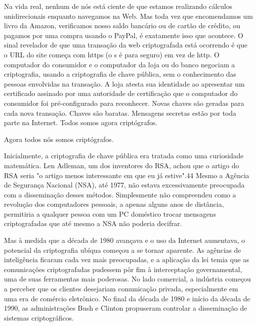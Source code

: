 \documentclass{book}
\begin{document}
Na vida real, nenhum de nós está ciente de que estamos realizando cálculos unidirecionais enquanto navegamos na Web. Mas toda vez que encomendamos um livro da Amazon, verificamos nosso saldo bancário ou de cartão de crédito, ou pagamos por uma compra usando o PayPal, é exatamente isso que acontece. O sinal revelador de que uma transação da web criptografada está ocorrendo é que o URL do site começa com https (o s é para seguro) em vez de http. O computador do consumidor e o computador da loja ou do banco negociam a criptografia, usando a criptografia de chave pública, sem o conhecimento das pessoas envolvidas na transação. A loja atesta sua identidade ao apresentar um certificado assinado por uma autoridade de certificação que o computador do consumidor foi pré-configurado para reconhecer. Novas chaves são geradas para cada nova transação. Chaves são baratas. Mensagens secretas estão por toda parte na Internet. Todos somos agora criptógrafos.

Agora todos nós somos criptógrafos.

Inicialmente, a criptografia de chave pública era tratada como uma curiosidade matemática. Len Adleman, um dos inventores do RSA, achou que o artigo do RSA seria "o artigo menos interessante em que eu já estive".44 Mesmo a Agência de Segurança Nacional (NSA), até 1977, não estava excessivamente preocupada com a disseminação desses métodos. Simplesmente não compreendeu como a revolução dos computadores pessoais, a apenas alguns anos de distância, permitiria a qualquer pessoa com um PC doméstico trocar mensagens criptografadas que até mesmo a NSA não poderia decifrar.

Mas à medida que a década de 1980 avançava e o uso da Internet aumentava, o potencial da criptografia ubíqua começou a se tornar aparente. As agências de inteligência ficaram cada vez mais preocupadas, e a aplicação da lei temia que as comunicações criptografadas pudessem pôr fim à interceptação governamental, uma de suas ferramentas mais poderosas. No lado comercial, a indústria começou a perceber que os clientes desejariam comunicação privada, especialmente em uma era de comércio eletrônico. No final da década de 1980 e início da década de 1990, as administrações Bush e Clinton propuseram controlar a disseminação de sistemas criptográficos.
\end{document}
